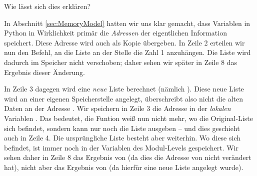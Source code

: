 Wie lässt sich dies erklären?

In Abschnitt \ref{sec:MemoryModel} hatten wir uns klar gemacht, dass Variablen in Python in Wirklichkeit primär die \emph{Adressen} der eigentlichen Information speichert. Diese Adresse wird auch als Kopie übergeben. In Zeile 2 erteilen wir nun den Befehl, an die Liste an der Stelle  die Zahl 1 anzuhängen. Die Liste wird dadurch im Speicher nicht verschoben; daher sehen wir später in Zeile 8 das Ergebnis dieser Änderung.

In Zeile 3 dagegen wird eine \emph{neue} Liste berechnet (nämlich \inPy{[1, 2]}). Diese neue Liste wird an einer eigenen Speicherstelle angelegt, überschreibt also nicht die alten Daten an der Adresse . Wir speichern in Zeile 3 die Adresse in der \emph{lokalen} Variablen . Das bedeutet, die Funtion  weiß nun nicht mehr, wo die Original-Liste sich befindet, sondern kann nur noch die Liste \inPy{[1 ,2]} ausgeben -- und dies geschieht auch in Zeile 4. Die ursprüngliche Liste besteht aber weiterhin. Wo diese sich befindet, ist immer noch in der Variablen  des Modul-Levels gespeichert. Wir sehen daher in Zeile 8 das Ergebnis von  (da dies die Adresse von  nicht verändert hat), nicht aber das Ergebnis von  (da hierfür eine neue Liste angelegt wurde).

